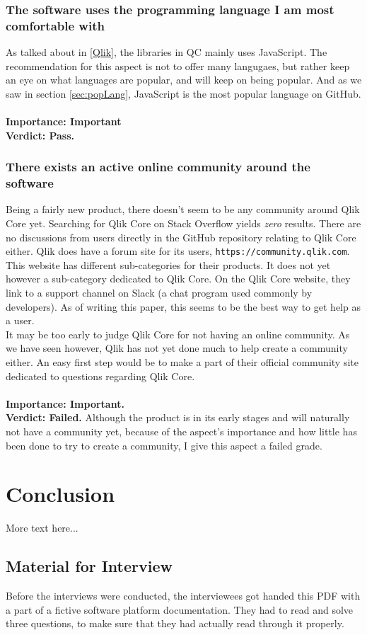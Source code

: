 \documentclass{cslthse-msc}
\begin{document}
    \subsection{The software uses the programming language I am most comfortable with}
    As talked about in \ref{Qlik}, the libraries in QC mainly uses JavaScript. The recommendation for this aspect is not to offer many langugaes, but rather keep an eye on what languages are popular, and will keep on being popular. And as we saw in section \ref{sec:popLang}, JavaScript is the most popular language on GitHub. \\\\
    \textbf{Importance: Important}\\
    \textbf{Verdict: Pass.}
    \subsection{There exists an active online community around the software}
    Being a fairly new product, there doesn't seem to be any community around Qlik Core yet. Searching for Qlik Core on Stack Overflow yields \textit{zero} results. There are no discussions from users directly in the GitHub repository relating to Qlik Core either. Qlik does have a forum site for its users, \texttt{https://community.qlik.com}. This website has different sub-categories for their products. It does not yet however a sub-category dedicated to Qlik Core. On the Qlik Core website, they link to a support channel on Slack (a chat program used commonly by developers). As of writing this paper, this seems to be the best way to get help as a user.\\
    It may be too early to judge Qlik Core for not having an online community. As we have seen however, Qlik has not yet done much to help create a community either. An easy first step would be to make a part of their official community site dedicated to questions regarding Qlik Core.\\ \\
    \textbf{Importance: Important.}\\
    \textbf{Verdict: Failed.} Although the product is in its early stages and will naturally not have a community yet, because of the aspect's importance and how little has been done to try to create a community, I give this aspect a failed grade.
    \chapter{Conclusion}
    More text here...
    \newpage
    
    \begin{appendices}
        \chapter{Material for Interview}\label{interviewMaterial}
        Before the interviews were conducted, the interviewees got handed this PDF with a part of a fictive software platform documentation. They had to read and solve three questions, to make sure that they had actually read through it properly.
        
    \end{appendices}
\end{document}

